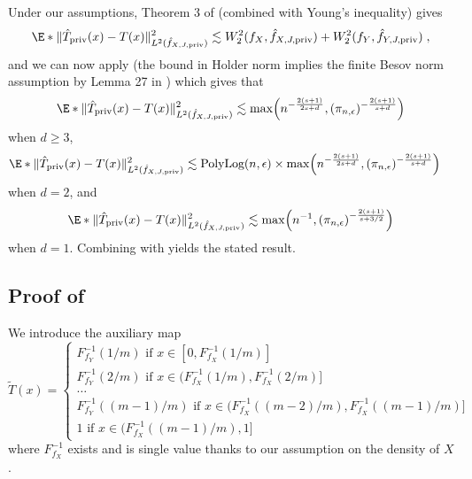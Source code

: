 \documentclass{article}
\newcommand{\1}{\mathds{1}}
\DeclarePairedDelimiter{\paren}{\lparen}{\rparen}
\theoremstyle{plain}
\theoremstyle{definition}
\theoremstyle{remark}
\begin{document}
Under our assumptions, Theorem 3 of \cite{balakrishnan2025stabilityboundssmoothoptimal} (combined with Young's inequality) gives 
\begin{equation}
    \begin{aligned}
        \E*{\| \hat{T}_{\textrm{priv}}(x) - T(x) \|^2_{L^2({\hat{f}_{X, J, \textrm{priv} }})}  }
        \lesssim 
        {W_2^2(f_X, \hat{f}_{X, J , \textrm{priv}}) + W_2^2(f_Y, \hat{f}_{Y, J , \textrm{priv}})} \;,
    \end{aligned}
\end{equation}
and we can  now apply  (the bound in Holder norm implies the finite Besov norm assumption by Lemma 27 in \cite{Manole2024Plugin}) which gives that 
\begin{equation}
    \E*{\| \hat{T}_{\textrm{priv}}(x) - T(x) \|^2_{L^2({\hat{f}_{X, J, \textrm{priv} }})}  }
    \lesssim 
    \max \paren*{n^{- \frac{2 (s + 1)}{ 2 s + d}}, (\pi_{n,\epsilon})^{- \frac{2 (s + 1)}{ s + d}}}
\end{equation}
when $d \geq 3$,
\begin{equation}
\begin{aligned}
    &\E*{\| \hat{T}_{\textrm{priv}}(x) - T(x) \|^2_{L^2({\hat{f}_{X, J, \textrm{priv} }})}  }
    \lesssim \text{PolyLog}(n, \epsilon) \times \max \paren*{n^{- \frac{2 (s + 1)}{ 2 s + d}}, (\pi_{n,\epsilon})^{- \frac{2 (s + 1)}{ s + d}}}
\end{aligned}
\end{equation}
when $d=2$,
and 
\begin{equation}
    \E*{\| \hat{T}_{\textrm{priv}}(x) - T(x) \|^2_{L^2({\hat{f}_{X, J, \textrm{priv} }})}  }
    \lesssim 
    \max \paren*{n^{- 1 }, (\pi_{n,\epsilon})^{- \frac{2 (s + 1)}{ s + 3/2}}}
\end{equation}
when $d=1$.
Combining with  yields the stated result.


\subsection{Proof of }
\label{proof_of_th:one_d_rate}

We introduce the auxiliary map 
\begin{equation}
    \tilde{T}(x) =
    \begin{cases}
        F_{f_Y}^{-1}(1/m) \text{ if } x \in [0, F_{f_X}^{-1}(1/m)] \\
        F_{f_Y}^{-1}(2/m) \text{ if } x \in (F_{f_X}^{-1}(1/m), F_{f_X}^{-1}(2/m)] \\
        \dots \\
        F_{f_Y}^{-1}((m-1)/m) \text{ if } x \in (F_{f_X}^{-1}((m-2)/m), F_{f_X}^{-1}((m-1)/m)] \\
        1 \text{ if } x \in (F_{f_X}^{-1}((m-1)/m), 1] 
    \end{cases}
\end{equation}
where $ F_{f_X}^{-1}$ exists and is single value thanks to our assumption on the density of $X$.
\end{document}
